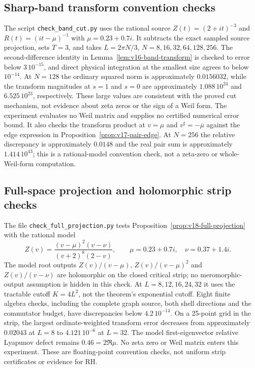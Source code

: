 \documentclass[11pt]{article}
\theoremstyle{remark}
\begin{document}
\subsection*{Sharp-band transform convention checks}
The script \texttt{check\_band\_cut.py} uses the rational source
$Z(t)=(2+it)^{-3}$ and $R(t)=(it-\mu)^{-1}$ with
$\mu=0.23+0.7i$. It subtracts the exact sampled source projection,
sets $T=3$, and takes $L=2\pi N/3$, $N=8,16,32,64,128,256$.
The second-difference identity in Lemma~\ref{lem:v16-band-transform}
is checked to error below $3\,10^{-15}$, and direct physical integration
at the smallest size agrees to below $10^{-14}$.
At $N=128$ the ordinary squared norm is approximately $0.0156032$,
while the transform magnitudes at $s=1$ and $s=0$ are approximately
$1.088\,10^{24}$ and $6.525\,10^{23}$, respectively. These large
values are consistent with the proved cut mechanism, not evidence about
zeta zeros or the sign of a Weil form. The experiment evaluates no Weil
matrix and supplies no certified numerical error bound. It also checks
the transform product at $v=\mu$ and $v^\sharp=-\overline\mu$ against
the edge expression in Proposition~\ref{prop:v17-pair-edge}. At $N=256$
the relative discrepancy is approximately $0.0148$ and the real pair sum
is approximately $1.414\,10^{43}$; this is a rational-model convention
check, not a zeta-zero or whole-Weil-form computation.

\subsection*{Full-space projection and holomorphic strip checks}
The file \texttt{check\_full\_projection.py} tests
Proposition~\ref{prop:v18-full-projection} with the rational model
\[
 Z(v)=\frac{(v-\mu)^2(v-\nu)}{(v+2)^8(2-v)},\qquad
 \mu=0.23+0.7i,\quad\nu=0.37+1.4i.
\]
The model root outputs $Z(v)/(v-\mu)$, $Z(v)/(v-\mu)^2$ and
$Z(v)/(v-\nu)$ are holomorphic on the closed critical strip;
no meromorphic-output assumption is hidden in this check. At
$L=8,12,16,24,32$ it uses the tractable cutoff $K=4L^2$, not the
theorem's exponential cutoff. Eight finite algebra checks, including
the complete graph source, both shell directions and the commutator
budget, have discrepancies below $4.2\,10^{-14}$.
On a 25-point grid in the strip, the largest ordinate-weighted transform
error decreases from approximately $0.02043$ at $L=8$ to
$4.121\,10^{-6}$ at $L=32$. The model first-eigenvector relative
Lyapunov defect remains $0.46=2\Re\mu$. No zeta zero or Weil matrix
enters this experiment. These are floating-point convention checks,
not uniform strip certificates or evidence for RH.
\end{document}
